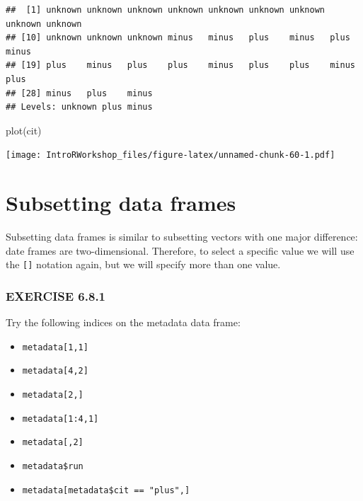 \documentclass[
]{book}
\newenvironment{Shaded}{\begin{snugshade}}{\end{snugshade}}
\newcommand{\FunctionTok}[1]{\textcolor[rgb]{0.00,0.00,0.00}{#1}}
\newcommand{\NormalTok}[1]{#1}
\providecommand{\tightlist}{%
  \setlength{\itemsep}{0pt}\setlength{\parskip}{0pt}}
\begin{document}
\begin{verbatim}
##  [1] unknown unknown unknown unknown unknown unknown unknown unknown unknown
## [10] unknown unknown unknown minus   minus   plus    minus   plus    minus  
## [19] plus    minus   plus    plus    minus   plus    plus    minus   plus   
## [28] minus   plus    minus  
## Levels: unknown plus minus
\end{verbatim}

\begin{Shaded}
\begin{Highlighting}[]
\FunctionTok{plot}\NormalTok{(cit)}
\end{Highlighting}
\end{Shaded}

\texttt{[image: IntroRWorkshop\_files/figure-latex/unnamed-chunk-60-1.pdf]}

\hypertarget{subsetting-data-frames}{%
\section{Subsetting data frames}\label{subsetting-data-frames}}

Subsetting data frames is similar to subsetting vectors with one major difference: date frames are two-dimensional. Therefore, to select a specific value we will use the \texttt{{[}{]}} notation again, but we will specify more than one value.

\hypertarget{exercise-6.8.1}{%
\subsubsection*{EXERCISE 6.8.1}\label{exercise-6.8.1}}

Try the following indices on the metadata data frame:

\begin{itemize}
\tightlist
\item
  \texttt{metadata{[}1,1{]}}
\item
  \texttt{metadata{[}4,2{]}}
\item
  \texttt{metadata{[}2,{]}}
\item
  \texttt{metadata{[}1:4,1{]}}
\item
  \texttt{metadata{[},2{]}}
\item
  \texttt{metadata\$run}
\item
  \texttt{metadata{[}metadata\$cit\ ==\ "plus",{]}}
\end{itemize}
\end{document}
